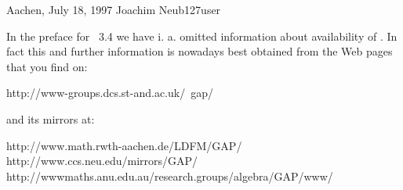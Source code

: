 Aachen, July 18, 1997 \hfill Joachim Neub\accent127user


In  the preface for {\GAP}~3.4 we  have i. a.   omitted information about
availability of {\GAP}. In fact  this and further information is nowadays
best obtained from the {\GAP} Web pages that you find on:

\begintt
    http://www-groups.dcs.st-and.ac.uk/~gap/
\endtt

and its mirrors at:

\begintt
    http://www.math.rwth-aachen.de/LDFM/GAP/
    http://www.ccs.neu.edu/mirrors/GAP/
    http://wwwmaths.anu.edu.au/research.groups/algebra/GAP/www/
\endtt

